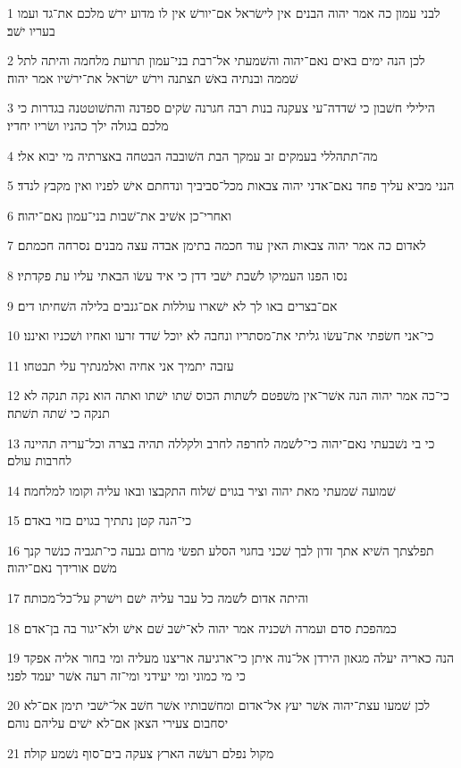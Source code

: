 \par 1 לבני עמון כה אמר יהוה הבנים אין לישׂראל אם־יורשׁ אין לו מדוע ירשׁ מלכם את־גד ועמו בעריו ישׁב׃
\par 2 לכן הנה ימים באים נאם־יהוה והשׁמעתי אל־רבת בני־עמון תרועת מלחמה והיתה לתל שׁממה ובנתיה באשׁ תצתנה וירשׁ ישׂראל את־ירשׁיו אמר יהוה׃
\par 3 הילילי חשׁבון כי שׁדדה־עי צעקנה בנות רבה חגרנה שׂקים ספדנה והתשׁוטטנה בגדרות כי מלכם בגולה ילך כהניו ושׂריו יחדיו׃
\par 4 מה־תתהללי בעמקים זב עמקך הבת השׁובבה הבטחה באצרתיה מי יבוא אלי׃
\par 5 הנני מביא עליך פחד נאם־אדני יהוה צבאות מכל־סביביך ונדחתם אישׁ לפניו ואין מקבץ לנדד׃
\par 6 ואחרי־כן אשׁיב את־שׁבות בני־עמון נאם־יהוה׃
\par 7 לאדום כה אמר יהוה צבאות האין עוד חכמה בתימן אבדה עצה מבנים נסרחה חכמתם׃
\par 8 נסו הפנו העמיקו לשׁבת ישׁבי דדן כי איד עשׂו הבאתי עליו עת פקדתיו׃
\par 9 אם־בצרים באו לך לא ישׁארו עוללות אם־גנבים בלילה השׁחיתו דים׃
\par 10 כי־אני חשׂפתי את־עשׂו גליתי את־מסתריו ונחבה לא יוכל שׁדד זרעו ואחיו ושׁכניו ואיננו׃
\par 11 עזבה יתמיך אני אחיה ואלמנתיך עלי תבטחו׃
\par 12 כי־כה אמר יהוה הנה אשׁר־אין משׁפטם לשׁתות הכוס שׁתו ישׁתו ואתה הוא נקה תנקה לא תנקה כי שׁתה תשׁתה׃
\par 13 כי בי נשׁבעתי נאם־יהוה כי־לשׁמה לחרפה לחרב ולקללה תהיה בצרה וכל־עריה תהיינה לחרבות עולם׃
\par 14 שׁמועה שׁמעתי מאת יהוה וציר בגוים שׁלוח התקבצו ובאו עליה וקומו למלחמה׃
\par 15 כי־הנה קטן נתתיך בגוים בזוי באדם׃
\par 16 תפלצתך השׁיא אתך זדון לבך שׁכני בחגוי הסלע תפשׂי מרום גבעה כי־תגביה כנשׁר קנך משׁם אורידך נאם־יהוה׃
\par 17 והיתה אדום לשׁמה כל עבר עליה ישׁם וישׁרק על־כל־מכותה׃
\par 18 כמהפכת סדם ועמרה ושׁכניה אמר יהוה לא־ישׁב שׁם אישׁ ולא־יגור בה בן־אדם׃
\par 19 הנה כאריה יעלה מגאון הירדן אל־נוה איתן כי־ארגיעה אריצנו מעליה ומי בחור אליה אפקד כי מי כמוני ומי יעידני ומי־זה רעה אשׁר יעמד לפני׃
\par 20 לכן שׁמעו עצת־יהוה אשׁר יעץ אל־אדום ומחשׁבותיו אשׁר חשׁב אל־ישׁבי תימן אם־לא יסחבום צעירי הצאן אם־לא ישׁים עליהם נוהם׃
\par 21 מקול נפלם רעשׁה הארץ צעקה בים־סוף נשׁמע קולה׃
